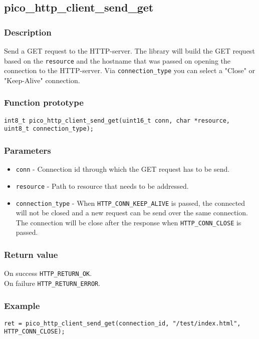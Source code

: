 \subsection{pico\_http\_client\_send\_get}
\subsubsection*{Description}
Send a GET request to the HTTP-server. The library will build the GET request based on the \texttt{resource} and the hostname that was passed on opening the connection to the HTTP-server. Via \texttt{connection\_type} you can select a "Close" or "Keep-Alive" connection.

\subsubsection*{Function prototype}
\texttt{int8\_t pico\_http\_client\_send\_get(uint16\_t conn, char *resource, uint8\_t connection\_type);}

\subsubsection*{Parameters}
\begin{itemize}[noitemsep]
\item \texttt{conn} - Connection id through which the GET request has to be send. 
\item \texttt{resource} - Path to resource that needs to be addressed.
\item \texttt{connection\_type} - When \texttt{HTTP\_CONN\_KEEP\_ALIVE} is passed, the connected will not be closed and a new request can be send over the same connection. The connection will be close after the response when \texttt{HTTP\_CONN\_CLOSE} is passed.
\end{itemize}

\subsubsection*{Return value}
On success \texttt{HTTP\_RETURN\_OK}.
\\On failure \texttt{HTTP\_RETURN\_ERROR}.

\subsubsection*{Example}
\begin{verbatim}
ret = pico_http_client_send_get(connection_id, "/test/index.html", HTTP_CONN_CLOSE);
\end{verbatim}

